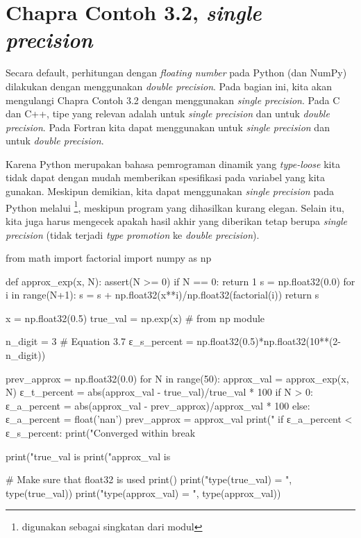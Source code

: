 \section{Chapra Contoh 3.2, \textit{single precision}}
Secara default, perhitungan dengan \textit{floating number} pada Python (dan NumPy)
dilakukan dengan menggunakan \textit{double precision}. Pada bagian ini, kita akan
mengulangi Chapra Contoh 3.2 dengan menggunakan \textit{single precision}.
Pada C dan C++, tipe yang relevan adalah 
untuk \textit{single precision} dan  untuk \textit{double
precision}.
Pada Fortran kita dapat menggunakan  untuk \textit{single precision}
dan  untuk \textit{double precision}.

Karena Python merupakan bahasa pemrograman dinamik yang \textit{type-loose} kita tidak dapat
dengan mudah memberikan spesifikasi pada variabel yang kita gunakan. Meskipun demikian, 
kita dapat menggunakan \textit{single precision} pada Python melalui
\footnote{ digunakan sebagai
singkatan dari modul },
meskipun program yang dihasilkan kurang elegan. Selain itu, kita juga harus mengecek
apakah hasil akhir yang diberikan tetap berupa \textit{single precision} (tidak terjadi
\textit{type promotion} ke \textit{double precision}).

\begin{pythoncode}
from math import factorial
import numpy as np
  
def approx_exp(x, N):
  assert(N >= 0)
  if N == 0:
      return 1
  s = np.float32(0.0)
  for i in range(N+1):
      s = s + np.float32(x**i)/np.float32(factorial(i))
  return s
  
x = np.float32(0.5)
true_val = np.exp(x) # from np module
  
n_digit = 3
# Equation 3.7
ε_s_percent = np.float32(0.5)*np.float32(10**(2-n_digit))
  
prev_approx = np.float32(0.0)
for N in range(50):
  approx_val = approx_exp(x, N)
  ε_t_percent = abs(approx_val - true_val)/true_val * 100
  if N > 0:
    ε_a_percent = abs(approx_val - prev_approx)/approx_val * 100
  else:
    ε_a_percent = float('nan')
  prev_approx = approx_val
  print("%
  if ε_a_percent < ε_s_percent:
    print("Converged within %
    break
  
print("true_val   is %
print("approx_val is %
  
# Make sure that float32 is used
print()
print("type(true_val)   = ", type(true_val))
print("type(approx_val) = ", type(approx_val))
\end{pythoncode}

